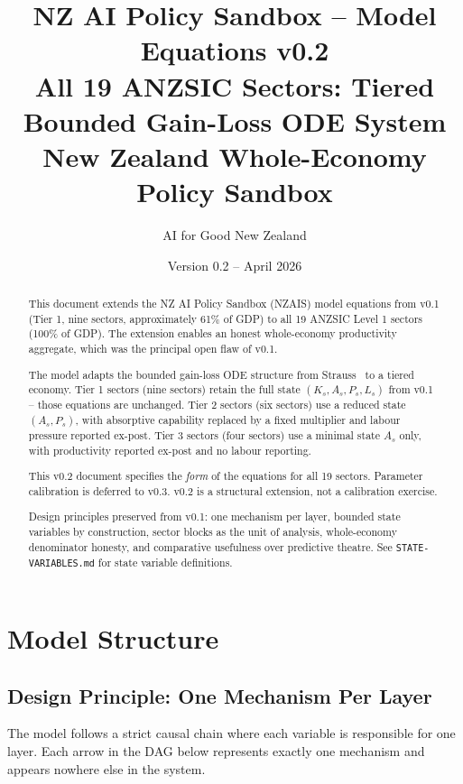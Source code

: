 \documentclass[11pt,a4paper]{article}
\title{%
  NZ AI Policy Sandbox -- Model Equations v0.2\\[0.5em]
  \large All 19 ANZSIC Sectors: Tiered Bounded Gain-Loss ODE System\\[0.3em]
  \normalsize New Zealand Whole-Economy Policy Sandbox
}
\author{AI for Good New Zealand}
\date{Version 0.2 -- April 2026}
\begin{document}
\maketitle

\begin{abstract}
This document extends the NZ AI Policy Sandbox (NZAIS) model equations from v0.1 (Tier 1, nine sectors, approximately 61\% of GDP) to all 19 ANZSIC Level 1 sectors (100\% of GDP). The extension enables an honest whole-economy productivity aggregate, which was the principal open flaw of v0.1.

The model adapts the bounded gain-loss ODE structure from Strauss~\cite{strauss2024} to a tiered economy. Tier 1 sectors (nine sectors) retain the full state $(K_s, A_s, P_s, L_s)$ from v0.1 -- those equations are unchanged. Tier 2 sectors (six sectors) use a reduced state $(A_s, P_s)$, with absorptive capability replaced by a fixed multiplier and labour pressure reported ex-post. Tier 3 sectors (four sectors) use a minimal state $A_s$ only, with productivity reported ex-post and no labour reporting.

This v0.2 document specifies the \emph{form} of the equations for all 19 sectors. Parameter calibration is deferred to v0.3. v0.2 is a structural extension, not a calibration exercise.

Design principles preserved from v0.1: one mechanism per layer, bounded state variables by construction, sector blocks as the unit of analysis, whole-economy denominator honesty, and comparative usefulness over predictive theatre. See \texttt{STATE-VARIABLES.md} for state variable definitions.
\end{abstract}

\tableofcontents
\newpage

\section{Model Structure}

\subsection{Design Principle: One Mechanism Per Layer}

The model follows a strict causal chain where each variable is responsible for one layer. Each arrow in the DAG below represents exactly one mechanism and appears nowhere else in the system.
\end{document}
